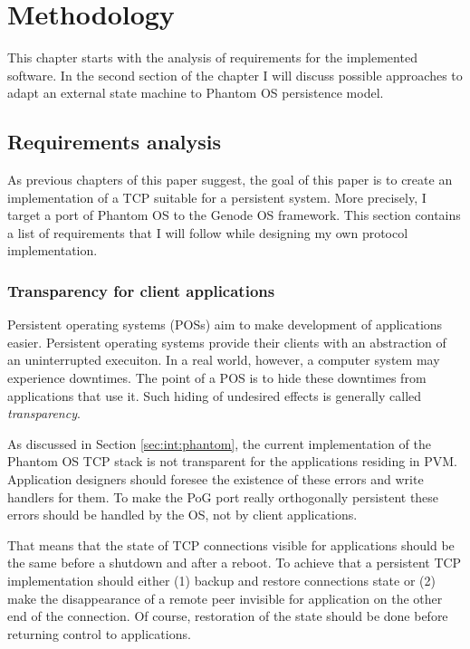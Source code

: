 \chapter{Methodology}
\label{chap:meth}

This chapter starts with the analysis of requirements for the implemented
software. In the second section of the chapter I will discuss possible
approaches to adapt an external state machine to Phantom OS persistence model.

\section {Requirements analysis}
\label{sec:meth:req}

As previous chapters of this paper suggest, the goal of this paper is to create
an implementation of a TCP suitable for a persistent system. More precisely, I
target a port of Phantom OS to the Genode OS framework. This section contains a
list of requirements that I will follow while designing my own protocol
implementation.

\subsection {Transparency for client applications}
Persistent operating systems (POSs) aim to make development of applications
easier. Persistent operating systems provide their clients with an abstraction
of an uninterrupted execuiton. In a real world, however, a computer system may
experience downtimes. The point of a POS is to hide these downtimes from
applications that use it. Such hiding of undesired effects is generally called
\textit{transparency}.

As discussed in Section \ref{sec:int:phantom}, the current implementation of
the Phantom OS TCP stack is not transparent for the applications residing
in PVM. Application designers should foresee the existence of these errors and
write handlers for them. To make the PoG port really orthogonally persistent
these errors should be handled by the OS, not by client applications.

That means that the state of TCP connections visible for applications should be
the same before a shutdown and after a reboot. To achieve that a persistent TCP
implementation should either (1) backup and restore connections state or (2)
make the disappearance of a remote peer invisible for application on the other
end of the connection. Of course, restoration of the state should be done
before returning control to applications.

